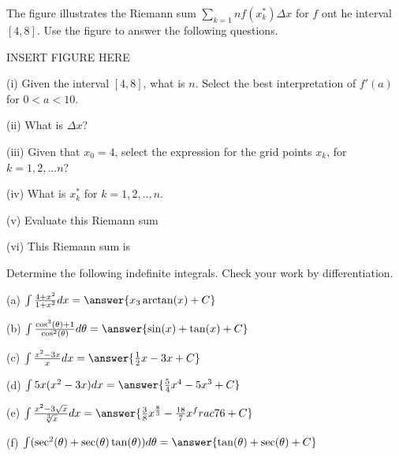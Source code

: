 \documentclass{ximera}
\begin{document}
\begin{exercise}
The figure illustrates the Riemann sum $\sum_{k=1}{n}f(x_k^*)\Delta x$ for $f$ ont he interval $[4,8]$.  Use the figure to answer the following questions.

INSERT FIGURE HERE

(i) Given the interval $[4,8]$, what is $n$.
Select the best interpretation of $f'(a)$ for $0<a<10$.
\begin{multipleChoice}
\end{multipleChoice}

(ii) What is $\Delta x$?
\begin{multipleChoice}
\end{multipleChoice}

(iii) Given that $x_0=4$, select the expression for the grid points $x_k$, for $k=1,2,...n$?
\begin{multipleChoice}
\end{multipleChoice}

(iv) What is $x_k^*$ for $k=1,2,..,n$.
\begin{multipleChoice}
\end{multipleChoice}

(v) Evaluate this Riemann sum
\begin{multipleChoice}
\end{multipleChoice}

(vi) This Riemann sum is
\begin{multipleChoice}
\end{multipleChoice}
\end{exercise}

\begin{exercise}
Determine the following indefinite integrals.  Check your work by differentiation.

(a) $\int\frac{4+x^2}{1+x^2}dx=\answer{x_3\arctan(x)+C}$

(b) $\int\frac{\cos^3(\theta)+1}{\cos^2(\theta)}d\theta=\answer{\sin(x)+\tan(x)+C}$

(c) $\int\frac{x^2-3x}{x}dx=\answer{\frac{1}{2}x-3x+C}$

(d) $\int 5x(x^2-3x)dx=\answer{\frac{5}{4}x^4-5x^3+C}$

(e) $\int\frac{x^2-3\sqrt{x}}{\sqrt[3]{x}}dx = \answer{\frac{3}{8}x^{\frac{8}{3}}-\frac{18}{7}x^frac{7}{6}+C}$

(f) $\int(\sec^2(\theta)+\sec(\theta)\tan(\theta))d\theta=\answer{\tan(\theta)+\sec(\theta)+C}$
\end{exercise}
\end{document}
